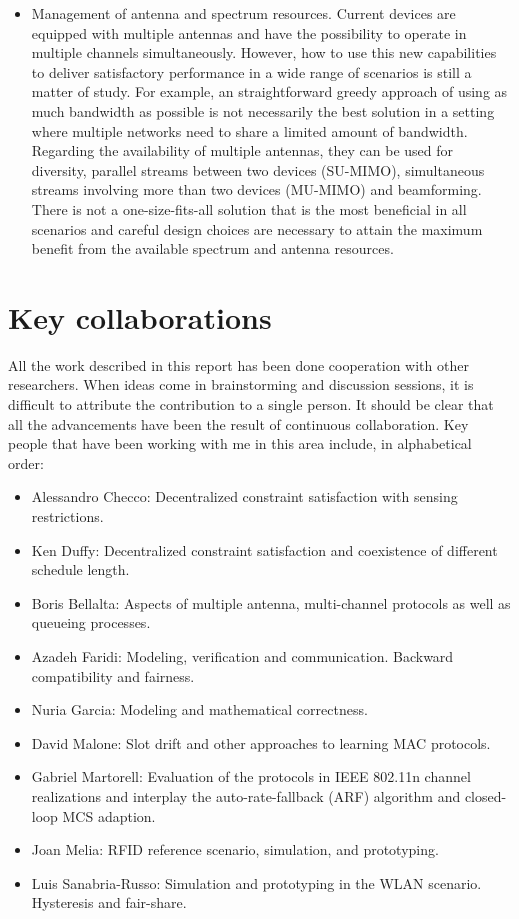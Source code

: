 \documentclass[a4paper,twocolumns]{article}%
\begin{document}
\begin{itemize}
\item Management of antenna and spectrum resources.
Current devices are equipped with multiple antennas and have the possibility to operate in multiple channels simultaneously.
However, how to use this new capabilities to deliver satisfactory performance in a wide range of scenarios is still a matter of study.
For example, an straightforward greedy approach of using as much bandwidth as possible is not necessarily the best solution in a setting where multiple networks need to share a limited amount of bandwidth.
Regarding the availability of multiple antennas, they can be used for diversity, parallel streams between two devices (SU-MIMO), simultaneous streams involving more than two devices (MU-MIMO) and beamforming.
There is not a one-size-fits-all solution that is the most beneficial in all scenarios and careful design choices are necessary to attain the maximum benefit from the available spectrum and antenna resources.
\end{itemize}

\section{Key collaborations}

All the work described in this report has been done cooperation with other researchers.
When ideas come in brainstorming and discussion sessions, it is difficult to attribute the contribution to a single person.
It should be clear that all the advancements have been the result of continuous collaboration.
Key people that have been working with me in this area include, in alphabetical order:
\begin{itemize}
\item Alessandro Checco: Decentralized constraint satisfaction with sensing restrictions.
\item Ken Duffy: Decentralized constraint satisfaction and coexistence of different schedule length.
\item Boris Bellalta: Aspects of multiple antenna, multi-channel protocols as well as queueing processes.
\item Azadeh Faridi: Modeling, verification and communication. Backward compatibility and fairness.
\item Nuria Garcia: Modeling and mathematical correctness.
\item David Malone: Slot drift and other approaches to learning MAC protocols.
\item Gabriel Martorell: Evaluation of the protocols in IEEE 802.11n channel realizations and interplay the auto-rate-fallback (ARF) algorithm and closed-loop MCS adaption.
\item Joan Melia: RFID reference scenario, simulation, and prototyping.
\item Luis Sanabria-Russo: Simulation and prototyping in the WLAN scenario. Hysteresis and fair-share.
\end{itemize}
\end{document}
